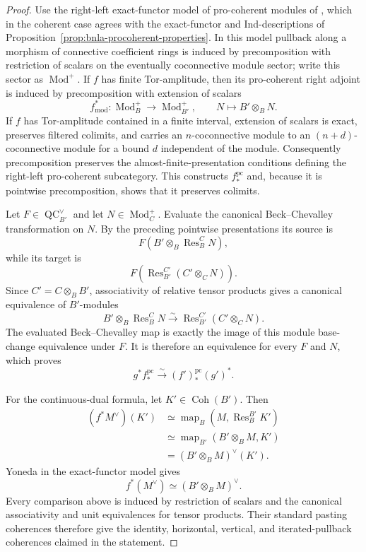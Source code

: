\begin{proof}
Use the right-left exact-functor model of pro-coherent modules of
\cite{BrantnerCamposNuiten2025}, which in the coherent case agrees with the
exact-functor and Ind-descriptions of
Proposition~\ref{prop:bnla-procoherent-properties}.  In this model pullback
along a morphism of connective coefficient rings is induced by precomposition
with restriction of scalars on the eventually coconnective module sector;
write this sector as $\operatorname{Mod}^{+}$.  If $f$ has finite
Tor-amplitude, then its pro-coherent right adjoint is induced by precomposition with extension of scalars
\[
    f^*_{\mathrm{mod}}:
    \operatorname{Mod}^{+}_B
    \longrightarrow
    \operatorname{Mod}^{+}_{B'},
    \qquad
    N\longmapsto B'\otimes_BN.
\]
If $f$ has Tor-amplitude contained in a finite interval, extension of scalars
is exact, preserves filtered colimits, and carries an $n$-coconnective module
to an $(n+d)$-coconnective module for a bound $d$ independent of the module.
Consequently precomposition preserves the almost-finite-presentation
conditions defining the right-left pro-coherent subcategory.  This constructs
$f_*^{\mathrm{pc}}$ and, because it is pointwise precomposition, shows that
it preserves colimits.

Let $F\in\operatorname{QC}^{\vee}_{B'}$ and let
$N\in\operatorname{Mod}^{+}_C$.  Evaluate the canonical
Beck--Chevalley transformation on $N$.  By the preceding pointwise
presentations its source is
\[
    F\left(B'\otimes_B\operatorname{Res}^{C}_{B}N\right),
\]
while its target is
\[
    F\left(
        \operatorname{Res}^{C'}_{B'}
        (C'\otimes_CN)
    \right).
\]
Since $C'=C\otimes_BB'$, associativity of relative tensor products gives a
canonical equivalence of $B'$-modules
\[
    B'\otimes_B\operatorname{Res}^{C}_{B}N
    \xrightarrow{\sim}
    \operatorname{Res}^{C'}_{B'}(C'\otimes_CN).
\]
The evaluated Beck--Chevalley map is exactly the image of this module
base-change equivalence under $F$.  It is therefore an equivalence for every
$F$ and $N$, which proves
\[
    g^*f_*^{\mathrm{pc}}
    \xrightarrow{\sim}
    (f')_*^{\mathrm{pc}}(g')^*.
\]

For the continuous-dual formula, let $K'\in\operatorname{Coh}(B')$.
Then
\[
\begin{aligned}
    (f^*M^\vee)(K')
    &\simeq
    \operatorname{map}_B
    \left(M,\operatorname{Res}^{B'}_BK'\right)\\
    &\simeq
    \operatorname{map}_{B'}
    \left(B'\otimes_BM,K'\right)\\
    &=
    (B'\otimes_BM)^\vee(K').
\end{aligned}
\]
Yoneda in the exact-functor model gives
\[
    f^*(M^\vee)\simeq(B'\otimes_BM)^\vee.
\]
Every comparison above is induced by restriction of scalars and the canonical
associativity and unit equivalences for tensor products.  Their standard
pasting coherences therefore give the identity, horizontal, vertical, and
iterated-pullback coherences claimed in the statement.
\end{proof}

